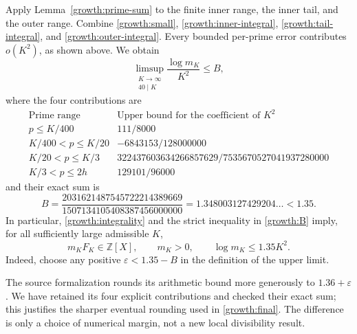 Apply Lemma~\ref{growth:prime-sum} to the finite inner range, the inner
tail, and the outer range. Combine
\eqref{growth:small}, \eqref{growth:inner-integral},
\eqref{growth:tail-integral}, and \eqref{growth:outer-integral}.
Every bounded per-prime error contributes \(o(K^2)\), as shown above.
We obtain
\begin{equation}\label{growth:limsup}
 \limsup_{\substack{K\to\infty\\40\mid K}}
 \frac{\log m_K}{K^2}\le B,
\end{equation}
where the four contributions are
\[
\begin{array}{c|c}
\text{Prime range}&\text{Upper bound for the coefficient of }K^2\\ \hline
p\le K/400&111/8000\\
K/400<p\le K/20&-6843153/128000000\\
K/20<p\le K/3&322437603634266857629/7535670527041937280000\\
K/3<p\le2h&129101/96000
\end{array}
\]
and their exact sum is
\begin{equation}\label{growth:B}
 B=\frac{2031621487545722214389669}{1507134105408387456000000}
  =1.348003127429204\ldots<1.35.
\end{equation}
In particular, \eqref{growth:integrality} and the strict inequality in
\eqref{growth:B} imply, for all sufficiently large admissible \(K\),
\begin{equation}\label{growth:final}
 \boxed{\quad m_KF_K\in\mathbb Z[X],\qquad
               m_K>0,\qquad \log m_K\le1.35K^2.\quad}
\end{equation}
Indeed, choose any positive \(\varepsilon<1.35-B\) in the definition
of the upper limit.

The source formalization rounds its arithmetic bound more generously
to \(1.36+\varepsilon\). We have retained its four explicit
contributions and checked their exact sum; this justifies the sharper
eventual rounding used in \eqref{growth:final}. The difference is
only a choice of numerical margin, not a new local divisibility result.

